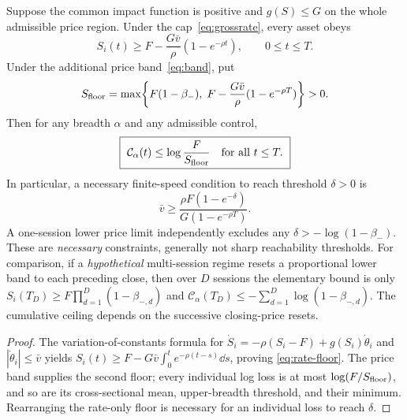 \documentclass[review,hidelinks,onefignum,onetabnum]{siamonline250211}
\begin{document}
\begin{proposition}\label{prop:rate-band}
Suppose the common impact function is positive and $g(S)\le G$ on the whole admissible price region. Under the cap~\eqref{eq:grossrate}, every asset obeys
\begin{equation}\label{eq:rate-floor}
 S_i(t)\ge F-\frac{G\bar v}{\rho}(1-e^{-\rho t}),\qquad 0\le t\le T.
\end{equation}
Under the additional price band~\eqref{eq:band}, put
\begin{equation}\label{eq:twofloors}
 S_{\rm floor}=\max\!\left\{F(1-\beta_-),\;F-\frac{G\bar v}{\rho}(1-e^{-\rho T})\right\}>0.
\end{equation}
Then for any breadth $\alpha$ and any admissible control,
\begin{equation}\label{eq:constrained-crisis}
\boxed{\ \mathcal C_\alpha(t)\le \log\frac{F}{S_{\rm floor}}\quad\hbox{for all }t\le T.\ }
\end{equation}
In particular, a necessary finite-speed condition to reach threshold $\delta>0$ is
\begin{equation}\label{eq:min-speed}
\boxed{\ \bar v\ge\frac{\rho F(1-e^{-\delta})}{G(1-e^{-\rho T})}.\ }
\end{equation}
A one-session lower price limit independently excludes any $\delta> -\log(1-\beta_-)$. These are \emph{necessary} constraints, generally not sharp reachability thresholds. For comparison, if a \emph{hypothetical} multi-session regime resets a proportional lower band to each preceding close, then over $D$ sessions the elementary bound is only
$S_i(T_D)\ge F\prod_{d=1}^D(1-\beta_{-,d})$ and
$\mathcal C_\alpha(T_D)\le-\sum_{d=1}^D\log(1-\beta_{-,d})$.
The cumulative ceiling depends on the successive closing-price resets.
\end{proposition}
\begin{proof}
The variation-of-constants formula for $\dot S_i=-\rho(S_i-F)+g(S_i)\dot\theta_i$ and $|\dot\theta_i|\le\bar v$ yields $S_i(t)\ge F-G\bar v\int_0^t e^{-\rho(t-s)}\dd s$, proving \eqref{eq:rate-floor}. The price band supplies the second floor; every individual log loss is at most $\log(F/S_{\rm floor})$, and so are its cross-sectional mean, upper-breadth threshold, and their minimum. Rearranging the rate-only floor is necessary for an individual loss to reach $\delta$.
\end{proof}
\end{document}
